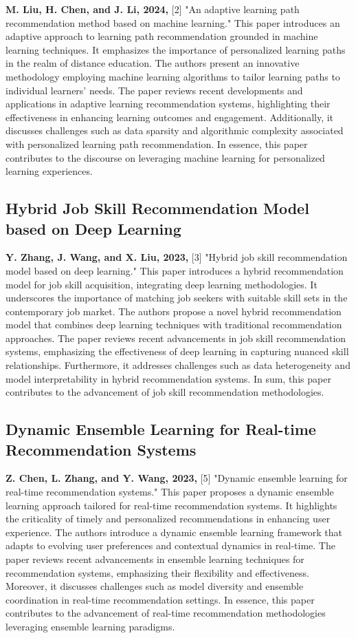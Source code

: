 \textbf{M. Liu, H. Chen, and J. Li, 2024,} [2] "An adaptive learning path recommendation method based on machine learning." This paper introduces an adaptive approach to learning path recommendation grounded in machine learning techniques. It emphasizes the importance of personalized learning paths in the realm of distance education. The authors present an innovative methodology employing machine learning algorithms to tailor learning paths to individual learners' needs. The paper reviews recent developments and applications in adaptive learning recommendation systems, highlighting their effectiveness in enhancing learning outcomes and engagement. Additionally, it discusses challenges such as data sparsity and algorithmic complexity associated with personalized learning path recommendation. In essence, this paper contributes to the discourse on leveraging machine learning for personalized learning experiences.

\subsection{Hybrid Job Skill Recommendation Model based on Deep Learning}

\textbf{Y. Zhang, J. Wang, and X. Liu, 2023,} [3] "Hybrid job skill recommendation model based on deep learning." This paper introduces a hybrid recommendation model for job skill acquisition, integrating deep learning methodologies. It underscores the importance of matching job seekers with suitable skill sets in the contemporary job market. The authors propose a novel hybrid recommendation model that combines deep learning techniques with traditional recommendation approaches. The paper reviews recent advancements in job skill recommendation systems, emphasizing the effectiveness of deep learning in capturing nuanced skill relationships. Furthermore, it addresses challenges such as data heterogeneity and model interpretability in hybrid recommendation systems. In sum, this paper contributes to the advancement of job skill recommendation methodologies.

\subsection{Dynamic Ensemble Learning for Real-time Recommendation Systems}

\textbf{Z. Chen, L. Zhang, and Y. Wang, 2023,} [5] "Dynamic ensemble learning for real-time recommendation systems." This paper proposes a dynamic ensemble learning approach tailored for real-time recommendation systems. It highlights the criticality of timely and personalized recommendations in enhancing user experience. The authors introduce a dynamic ensemble learning framework that adapts to evolving user preferences and contextual dynamics in real-time. The paper reviews recent advancements in ensemble learning techniques for recommendation systems, emphasizing their flexibility and effectiveness. Moreover, it discusses challenges such as model diversity and ensemble coordination in real-time recommendation settings. In essence, this paper contributes to the advancement of real-time recommendation methodologies leveraging ensemble learning paradigms.

